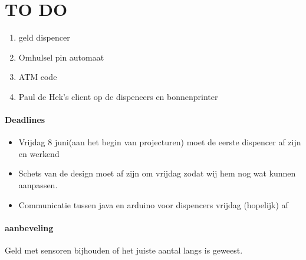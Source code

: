 \documentclass{article}
\begin{document}
\section{TO DO}
\begin{enumerate}
	\item geld dispencer
	\item Omhulsel pin automaat
	\item ATM code 
	\item Paul de Hek's client op de dispencers en bonnenprinter
\end{enumerate}

\paragraph{Deadlines}
\begin{itemize}
	\item Vrijdag 8 juni(aan het begin van projecturen)  moet de eerste dispencer af zijn en werkend
	\item Schets van de design moet af zijn om vrijdag zodat wij hem nog wat kunnen aanpassen.
	\item Communicatie tussen java en arduino voor dispencers vrijdag (hopelijk) af 	
\end{itemize}

\paragraph{aanbeveling}
Geld met sensoren bijhouden of het juiste aantal langs is geweest. 
\end{document}
